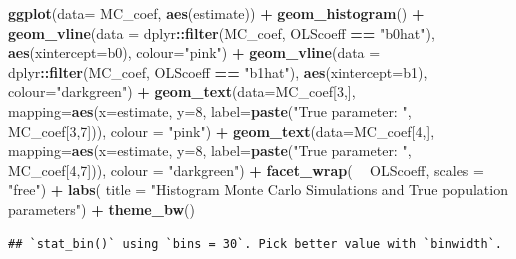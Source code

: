 \documentclass[]{book}
\newenvironment{Shaded}{\begin{snugshade}}{\end{snugshade}}
\newcommand{\DataTypeTok}[1]{\textcolor[rgb]{0.13,0.29,0.53}{#1}}
\newcommand{\DecValTok}[1]{\textcolor[rgb]{0.00,0.00,0.81}{#1}}
\newcommand{\KeywordTok}[1]{\textcolor[rgb]{0.13,0.29,0.53}{\textbf{#1}}}
\newcommand{\NormalTok}[1]{#1}
\newcommand{\OperatorTok}[1]{\textcolor[rgb]{0.81,0.36,0.00}{\textbf{#1}}}
\newcommand{\StringTok}[1]{\textcolor[rgb]{0.31,0.60,0.02}{#1}}
\begin{document}
\begin{Shaded}
\begin{Highlighting}[]
\KeywordTok{ggplot}\NormalTok{(}\DataTypeTok{data=}\NormalTok{ MC_coef, }\KeywordTok{aes}\NormalTok{(estimate)) }\OperatorTok{+}\StringTok{ }
\StringTok{  }\KeywordTok{geom_histogram}\NormalTok{() }\OperatorTok{+}\StringTok{ }
\StringTok{  }\KeywordTok{geom_vline}\NormalTok{(}\DataTypeTok{data =}\NormalTok{ dplyr}\OperatorTok{::}\KeywordTok{filter}\NormalTok{(MC_coef, OLScoeff }\OperatorTok{==}\StringTok{ "b0hat"}\NormalTok{), }\KeywordTok{aes}\NormalTok{(}\DataTypeTok{xintercept=}\NormalTok{b0), }\DataTypeTok{colour=}\StringTok{"pink"}\NormalTok{)  }\OperatorTok{+}\StringTok{  }
\StringTok{  }\KeywordTok{geom_vline}\NormalTok{(}\DataTypeTok{data =}\NormalTok{ dplyr}\OperatorTok{::}\KeywordTok{filter}\NormalTok{(MC_coef, OLScoeff }\OperatorTok{==}\StringTok{ "b1hat"}\NormalTok{), }\KeywordTok{aes}\NormalTok{(}\DataTypeTok{xintercept=}\NormalTok{b1), }\DataTypeTok{colour=}\StringTok{"darkgreen"}\NormalTok{)  }\OperatorTok{+}\StringTok{ }
\StringTok{  }\KeywordTok{geom_text}\NormalTok{(}\DataTypeTok{data=}\NormalTok{MC_coef[}\DecValTok{3}\NormalTok{,], }\DataTypeTok{mapping=}\KeywordTok{aes}\NormalTok{(}\DataTypeTok{x=}\NormalTok{estimate, }\DataTypeTok{y=}\DecValTok{8}\NormalTok{, }\DataTypeTok{label=}\KeywordTok{paste}\NormalTok{(}\StringTok{"True parameter: "}\NormalTok{, MC_coef[}\DecValTok{3}\NormalTok{,}\DecValTok{7}\NormalTok{])), }\DataTypeTok{colour =} \StringTok{"pink"}\NormalTok{) }\OperatorTok{+}
\StringTok{  }\KeywordTok{geom_text}\NormalTok{(}\DataTypeTok{data=}\NormalTok{MC_coef[}\DecValTok{4}\NormalTok{,], }\DataTypeTok{mapping=}\KeywordTok{aes}\NormalTok{(}\DataTypeTok{x=}\NormalTok{estimate, }\DataTypeTok{y=}\DecValTok{8}\NormalTok{, }\DataTypeTok{label=}\KeywordTok{paste}\NormalTok{(}\StringTok{"True parameter: "}\NormalTok{, MC_coef[}\DecValTok{4}\NormalTok{,}\DecValTok{7}\NormalTok{])), }\DataTypeTok{colour =} \StringTok{"darkgreen"}\NormalTok{) }\OperatorTok{+}
\StringTok{  }\KeywordTok{facet_wrap}\NormalTok{( }\OperatorTok{~}\StringTok{ }\NormalTok{OLScoeff, }\DataTypeTok{scales =} \StringTok{"free"}\NormalTok{)   }\OperatorTok{+}
\StringTok{  }\KeywordTok{labs}\NormalTok{(}
    \DataTypeTok{title =} \StringTok{"Histogram Monte Carlo Simulations and True population parameters"}\NormalTok{) }\OperatorTok{+}
\StringTok{  }\KeywordTok{theme_bw}\NormalTok{()}
\end{Highlighting}
\end{Shaded}

\begin{verbatim}
## `stat_bin()` using `bins = 30`. Pick better value with `binwidth`.
\end{verbatim}
\end{document}
